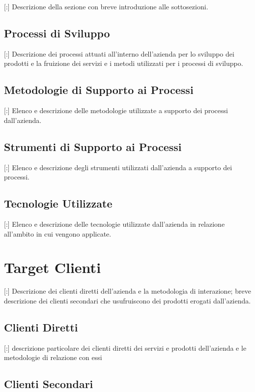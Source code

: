 \documentclass[11pt]{book}              %
\begin{document}
[:] Descrizione della sezione con breve introduzione alle sottosezioni.

\subsection{Processi di Sviluppo}

[:] Descrizione dei processi attuati all'interno dell'azienda per lo sviluppo dei prodotti e la fruizione dei servizi e i metodi utilizzati per i processi di sviluppo.

\subsection{Metodologie di Supporto ai Processi}

[:] Elenco e descrizione delle metodologie utilizzate a supporto dei processi dall'azienda.

\subsection{Strumenti di Supporto ai Processi}

[:] Elenco e descrizione degli strumenti utilizzati dall'azienda a supporto dei processi.

\subsection{Tecnologie Utilizzate}

[:] Elenco e descrizione delle tecnologie utilizzate dall'azienda in relazione all'ambito in cui vengono applicate.

\section{Target Clienti}

[:] Descrizione dei clienti diretti dell'azienda e la metodologia di interazione; breve descrizione dei clienti secondari che usufruiscono dei prodotti erogati dall'azienda.

\subsection{Clienti Diretti}

[:]  descrizione particolare dei clienti diretti dei servizi e prodotti dell'azienda e le metodologie di relazione con essi

\subsection{Clienti Secondari}
\end{document}
